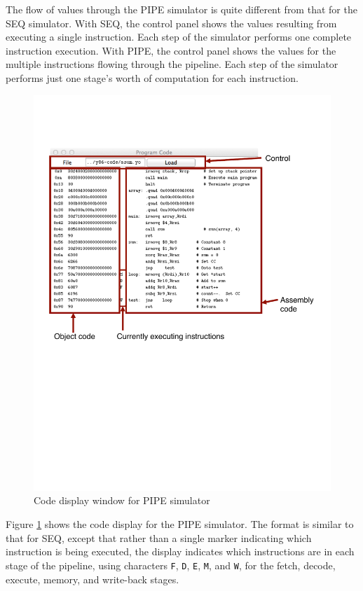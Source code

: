 \documentclass[11pt]{article}
\begin{document}
The flow of values through the PIPE simulator is quite different from
that for the SEQ simulator.  With SEQ, the control
panel shows the values resulting from executing a single instruction.
Each step of the simulator performs one complete instruction execution.
With PIPE, the control panel shows the values for the multiple
instructions flowing through the pipeline.  Each step of the simulator
performs just one stage's worth of computation for each instruction.

\begin{figure}
\centerline{\includegraphics*[scale=1.0]{pipe-code}}
\caption{Code display window for PIPE simulator}
\label{fig:sim:pipe-code}
\end{figure}

Figure \ref{fig:sim:pipe-code} shows the code display for the PIPE
simulator.  The format is similar to that for SEQ, except
that rather than a single marker indicating which instruction is being
executed, the display indicates which instructions are in each
stage of the pipeline, using characters \texttt{F}, \texttt{D},
\texttt{E}, \texttt{M}, and \texttt{W}, for the fetch, decode,
execute, memory, and write-back stages.
\end{document}
